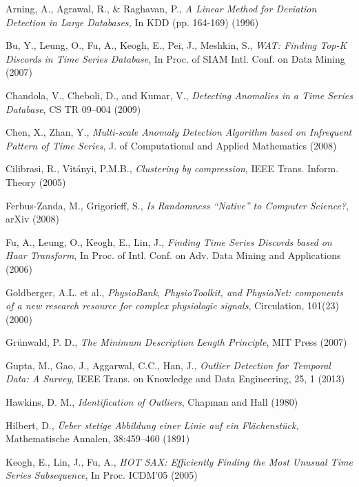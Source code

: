 \documentclass{sig-alternate}
\begin{document}
\begin{thebibliography}{99}
\vspace{1em}
Arning, A., Agrawal, R., \& Raghavan, P.,
{\em A Linear Method for Deviation Detection in Large Databases,}
In KDD (pp. 164-169) (1996)

Bu, Y., Leung, O., Fu, A., Keogh, E., Pei, J., Meshkin, S.,
{\em WAT: Finding Top-K Discords in Time Series Database},
In Proc. of SIAM Intl. Conf. on Data Mining (2007)

Chandola, V., Cheboli, D., and Kumar, V.,
{\em Detecting Anomalies in a Time Series Database},
CS TR 09--004 (2009)

Chen, X., Zhan, Y.,
{\em Multi-scale Anomaly Detection Algorithm based on Infrequent Pattern of Time Series},
J. of Computational and Applied Mathematics (2008)

Cilibrasi, R., Vit{\'a}nyi, P.M.B.,
{\em Clustering by compression}, 
IEEE Trans. Inform. Theory (2005)

Ferbus-Zanda, M., Grigorieff, S.,
{\em Is Randomness ``Native'' to Computer Science?},
arXiv (2008)

Fu, A., Leung, O., Keogh, E., Lin, J.,
{\em Finding Time Series Discords based on Haar Transform},
In Proc. of Intl. Conf. on Adv. Data Mining and Applications (2006)

Goldberger, A.L. et al., 
{\em PhysioBank, PhysioToolkit, and PhysioNet: components of a new research resource for complex physiologic signals},
Circulation, 101(23) (2000)

Gr{\"u}nwald, P. D.,
{\em The Minimum Description Length Principle},
MIT Press (2007)

Gupta, M., Gao, J., Aggarwal, C.C., Han, J.,
{\em Outlier Detection for Temporal Data: A Survey},
IEEE Trans. on Knowledge and Data Engineering, 25, 1 (2013)

Hawkins, D. M.,
{\em Identification of Outliers},
Chapman and Hall (1980)

Hilbert, D.,
{\em \"{U}eber stetige Abbildung einer Linie auf ein Fl\"{a}chenst\"{u}ck}, 
Mathematische Annalen, 38:459--460 (1891)

Keogh, E., Lin, J., Fu, A.,
{\em HOT SAX: Efficiently Finding the Most Unusual Time Series Subsequence},
In Proc. ICDM'05 (2005)


\end{thebibliography}
\end{document}
